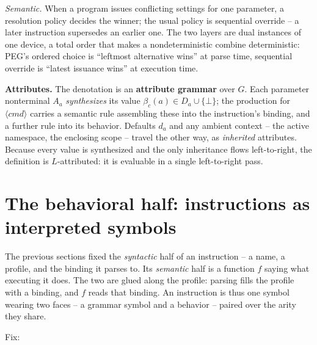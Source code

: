 \documentclass[11pt]{article}
\begin{document}
\emph{Semantic.} When a program issues conflicting settings for one parameter, a
resolution policy decides the winner; the usual policy is sequential override -- a
later instruction supersedes an earlier one. The two layers are dual instances of
one device, a total order that makes a nondeterministic combine deterministic:
PEG's ordered choice is ``leftmost alternative wins'' at parse time, sequential
override is ``latest issuance wins'' at execution time.

\textbf{Attributes.} The denotation is an \textbf{attribute grammar} over \(G\).
Each parameter nonterminal \(A_a\) \emph{synthesizes} its value
\(\beta_c(a)\in D_a\cup\{\bot\}\); the production for \(\langle\textit{cmd}\rangle\)
carries a semantic rule assembling these into the instruction's binding, and a
further rule into its behavior. Defaults \(d_a\) and any ambient context -- the
active namespace, the enclosing scope -- travel the other way, as \emph{inherited}
attributes. Because every value is synthesized and the only inheritance flows
left-to-right, the definition is \(L\)-attributed: it is evaluable in a single
left-to-right pass.

\section*{The behavioral half: instructions as interpreted symbols}

The previous sections fixed the \emph{syntactic} half of an instruction -- a
name, a profile, and the binding it parses to. Its \emph{semantic} half is a
function \(f\) saying what executing it does. The two are glued along the profile:
parsing fills the profile with a binding, and \(f\) reads that binding. An
instruction is thus one symbol wearing two faces -- a grammar symbol and a
behavior -- paired over the arity they share.

Fix:
\end{document}
